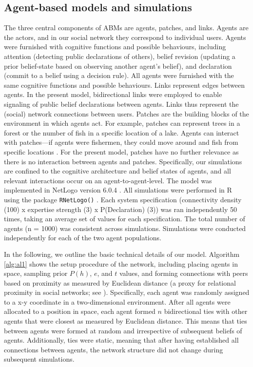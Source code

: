 \documentclass[fleqn,10pt]{wlscirep}
\begin{document}
\subsection*{Agent-based models and simulations}
The three central components of ABMs are agents, patches, and links. Agents are the actors, and in our social network they correspond to individual users. Agents were furnished with cognitive functions and possible behaviours, including attention (detecting public declarations of others), belief revision (updating a prior belief-state based on observing another agent’s belief), and declaration (commit to a belief using a decision rule). All agents were furnished with the same cognitive functions and possible behaviours. Links represent edges between agents. In the present model, bidirectional links were employed to enable signaling of public belief declarations between agents. Links thus represent the (social) network connections between users. Patches are the building blocks of the environment in which agents act. For example, patches can represent trees in a forest or the number of fish in a specific location of a lake. Agents can interact with patches---if agents were fishermen, they could move around and fish from specific locations \cite{bailey2018computational}. For the present model, patches have no further relevance as there is no interaction between agents and patches. Specifically, our simulations are confined to the cognitive architecture and belief states of agents, and all relevant interactions occur on an agent-to-agent-level.
The model was implemented in NetLogo version 6.0.4 \cite{wilensky1999netlogo}. All simulations were performed in R using the package {\tt RNetLogo()} \cite{thiele2014r}. Each system specification (connectivity density (100) x expertise strength (3) x P(Declaration) (3)) was ran independently 50 times, taking an average set of values for each specification. The total number of agents (n = 1000) was consistent across simulations. Simulations were conducted independently for each of the two agent populations.

In the following, we outline the basic technical details of our model. Algorithm \ref{alg:al1} shows the setup procedure of the network, including placing agents in space, sampling prior \(P(h)\), \(e\), and \(t\) values, and forming connections with peers based on proximity as measured by Euclidean distance (a proxy for relational proximity in social networks; see \cite{duggins2017}). Specifically, each agent was randomly assigned to a x-y coordinate in a two-dimensional environment. After all agents were allocated to a position in space, each agent formed \(n\) bidirectional ties with other agents that were closest as measured by Euclidean distance. This means that ties between agents were formed at random and irrespective of subsequent beliefs of agents. Additionally, ties were static, meaning that after having established all connections between agents, the network structure did not change during subsequent simulations.  
\end{document}
